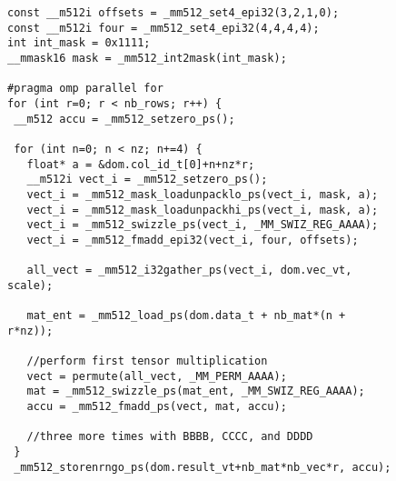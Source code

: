 \documentclass{article}
\begin{document}
\thispagestyle{empty}

\begin{figure}[h]
\begin{center}
\begin{verbatim}
const __m512i offsets = _mm512_set4_epi32(3,2,1,0);
const __m512i four = _mm512_set4_epi32(4,4,4,4); 
int int_mask = 0x1111;
__mmask16 mask = _mm512_int2mask(int_mask);

#pragma omp parallel for
for (int r=0; r < nb_rows; r++) {
 __m512 accu = _mm512_setzero_ps();

 for (int n=0; n < nz; n+=4) {
   float* a = &dom.col_id_t[0]+n+nz*r;
   __m512i vect_i = _mm512_setzero_ps();
   vect_i = _mm512_mask_loadunpacklo_ps(vect_i, mask, a);
   vect_i = _mm512_mask_loadunpackhi_ps(vect_i, mask, a);
   vect_i = _mm512_swizzle_ps(vect_i, _MM_SWIZ_REG_AAAA);
   vect_i = _mm512_fmadd_epi32(vect_i, four, offsets);

   all_vect = _mm512_i32gather_ps(vect_i, dom.vec_vt, scale);

   mat_ent = _mm512_load_ps(dom.data_t + nb_mat*(n + r*nz));

   //perform first tensor multiplication
   vect = permute(all_vect, _MM_PERM_AAAA);
   mat = _mm512_swizzle_ps(mat_ent, _MM_SWIZ_REG_AAAA);
   accu = _mm512_fmadd_ps(vect, mat, accu);

   //three more times with BBBB, CCCC, and DDDD
 }
 _mm512_storenrngo_ps(dom.result_vt+nb_mat*nb_vec*r, accu);  
\end{verbatim}
\end{center}
\end{figure}
\end{document}
